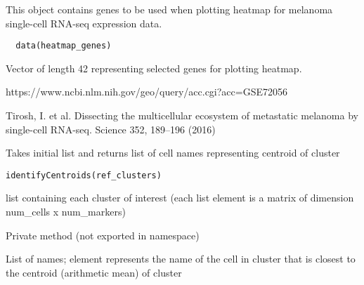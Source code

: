 \documentclass[a4paper]{book}
\begin{document}
%
\begin{Description}\relax
This object contains genes to be used when plotting heatmap for melanoma single-cell RNA-seq expression data.
\end{Description}
%
\begin{Usage}
\begin{verbatim}
  data(heatmap_genes)
\end{verbatim}
\end{Usage}
%
\begin{Format}
Vector of length 42 representing selected genes for plotting heatmap.
\end{Format}
%
\begin{Source}\relax
https://www.ncbi.nlm.nih.gov/geo/query/acc.cgi?acc=GSE72056
\end{Source}
%
\begin{References}\relax
Tirosh, I. et al. Dissecting the multicellular ecosystem of metastatic melanoma by single-cell RNA-seq. Science 352, 189–196 (2016)
\end{References}
%
\begin{Description}\relax
Takes initial list and returns list of cell names representing centroid of cluster
\end{Description}
%
\begin{Usage}
\begin{verbatim}
identifyCentroids(ref_clusters)
\end{verbatim}
\end{Usage}
%
\begin{Arguments}
\begin{ldescription}
\item[\code{ref\_clusters}] list containing each cluster of interest (each list element is a matrix of dimension num\_cells x num\_markers)
\end{ldescription}
\end{Arguments}
%
\begin{Details}\relax
Private method (not exported in namespace)
\end{Details}
%
\begin{Value}
List of names; element  represents the name of the cell in cluster  that is closest to the centroid (arithmetic mean) of cluster 
\end{Value}
\end{document}
